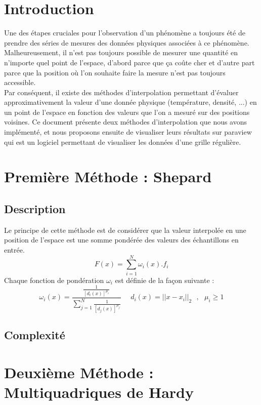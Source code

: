 \documentclass[a4paper,9pt]{article}
\begin{document}
\section{Introduction}
\label{sec:introduction}
Une des étapes cruciales pour l'observation d'un phénomène a toujours été de prendre des séries de mesures des données physiques associées à ce phénomène. Malheureusement, il n'est pas toujours possible de mesurer une quantité en n'importe quel point de l'espace, d'abord parce que ça coûte cher et d'autre part parce que la position où l'on souhaite faire la mesure n'est pas toujours accessible.\\ Par conséquent, il existe des méthodes d'interpolation permettant d'évaluer approximativement la valeur d'une donnée physique (température, densité, ...) en un point de l'espace en fonction des valeurs que l'on a mesuré sur des positions voisines. Ce document présente deux méthodes d'interpolation que nous avons implémenté, et nous proposons ensuite de visualiser leurs résultats sur paraview qui est un logiciel permettant de visualiser les données d'une grille régulière.

\section{Première Méthode : Shepard}
\label{sec:shepard}

\subsection{Description}
\label{subsec:shepard_description}
Le principe de cette méthode est de considérer que la valeur interpolée en une position de l'espace est une somme pondérée des valeurs des échantillons en entrée.
$$F(x)=\sum_{i=1}^{N} \omega_{i}(x).f_{i}$$
Chaque fonction de pondération $\omega_{i}$ est définie de la façon suivante :
$$\omega_{i}(x)=\frac{\frac{1}{[d_{i}(x)]^{\mu_{i}}}}{\sum_{j=1}^{N}\frac{1}{[d_{j}(x)]^{\mu_{j}}}} ~~~~~~ d_{i}(x)=||x-x_{i}||_{2}~~~,~~~\mu_{i}\ge1$$


\subsection{Complexité}
\label{subsec:shepard_complexite}

\section{Deuxième Méthode : Multiquadriques de Hardy}
\label{sec:hardy}
\end{document}
